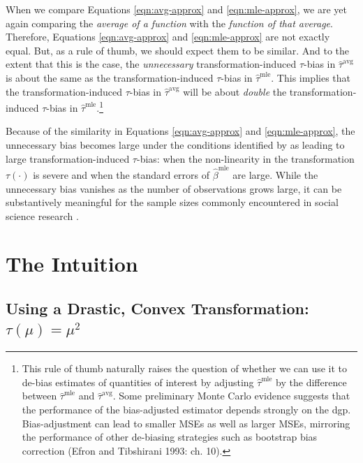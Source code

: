 \documentclass[11pt]{article}
\begin{document}
When we compare Equations \ref{eqn:avg-approx} and \ref{eqn:mle-approx}, we are yet again comparing the \textit{average of a function} with the \textit{function of that average}.
Therefore, Equations \ref{eqn:avg-approx} and \ref{eqn:mle-approx} are not exactly equal.
But, as a rule of thumb, we should expect them to be similar.
And to the extent that this is the case, the \emph{unnecessary} transformation-induced $\tau$-bias in $\hat{\tau}^\text{avg}$ is about the same as the transformation-induced $\tau$-bias in $\hat{\tau}^\text{mle}$.
This implies that the transformation-induced $\tau$-bias in $\hat{\tau}^\text{avg}$ will be about \emph{double} the transformation-induced $\tau$-bias in $\hat{\tau}^\text{mle}$.\footnote{This rule of thumb naturally raises the question of whether we can use it to de-bias estimates of quantities of interest by adjusting $\hat{\tau}^\text{mle}$ by the difference between $\hat{\tau}^\text{mle}$ and $\hat{\tau}^\text{avg}$.
Some preliminary Monte Carlo evidence suggests that the performance of the bias-adjusted estimator depends strongly on the dgp.
Bias-adjustment can lead to smaller MSEs as well as larger MSEs, mirroring the performance of other de-biasing strategies such as bootstrap bias correction (Efron and Tibshirani 1993: ch. 10).}

Because of the similarity in Equations \ref{eqn:avg-approx} and \ref{eqn:mle-approx}, the unnecessary bias becomes large under the conditions identified by \cite{Rainey2017} as leading to large transformation-induced $\tau$-bias: when the non-linearity in the transformation $\tau(\cdot)$ is severe and when the standard errors of $\hat{\beta}^\text{mle}$ are large.
While the unnecessary bias vanishes as the number of observations grows large, it can be substantively meaningful for the sample sizes commonly encountered in social science research \citep{Rainey2017}.

\section*{The Intuition}

\subsection*{Using a Drastic, Convex Transformation: $\tau(\mu) = \mu^2$}
\end{document}

